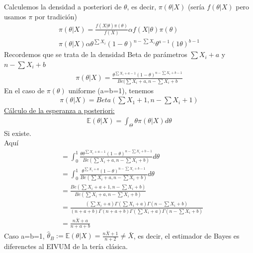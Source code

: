 \documentclass[10pt]{article}
\theoremstyle{plain}
\theoremstyle{definition}
\begin{document}
Calculemos la densidad a posteriori de $\theta$, es decir, $\pi(\theta|X)$ (sería $f(\theta|X)$ pero usamos $\pi$ por tradición)
\begin{align*}
\pi(\theta|X) = \frac{f(X|\theta)\pi(\theta)}{f(X)} \alpha f(X|\theta)\pi(\theta)\\
\pi(\theta|X) \alpha \theta^{\sum X_{i}}(1-\theta)^{n-\sum X_{i}} \theta^{a-1}(1\theta)^{b-1}
\end{align*}
Recordemos que se trata de la densidad Beta de parámetros $\sum X_{i}+a$ y $n-\sum X_{i} +b$
\begin{align*}
\pi(\theta|X) = \frac{\theta^{\sum X_{i}+a-1}(1-\theta)^{n-\sum X_{i} +b -1}}{Be(\sum X_{i}+a,n-\sum X_{i}+b}
\end{align*}
En el caso de $\pi(\theta)$ uniforme (a=b=1), tenemos
\begin{align*}
\pi(\theta|X) = Beta(\sum X_{1} + 1, n-\sum X_{i}+1)
\end{align*}
\underline{Cálculo de la esperanza a posteriori:}
\begin{align*}
\mathbb{E}(\theta|X) = \int_{\Theta}\theta\pi(\theta|X)d\theta
\end{align*}
Si existe.\\
Aquí
\begin{align*}
&= \int_{0}^{1} \frac{\theta\theta^{\sum X_{i}+a-1}(1-\theta)^{n-\sum X_{i} +b - 1}}{Be(\sum X_{i}+a,n-\sum X_{i}+b)}d\theta\\
&= \int_{0}^{1}\frac{\theta^{\sum X_{i} +a}(1-\theta)^{n-\sum X_{i} + b -1}}{Be(\sum X_{i}+a,n-\sum X_{i}+b)}d\theta\\
&= \frac{Be(\sum X_{i} +a +1,n-\sum X_{i} +b)}{Be(\sum X_{i}+a, n-\sum X_{i} +b)}\\
&= \frac{(\sum X_{i}+a)\Gamma(\sum X_{i} + a)\Gamma(n-\sum X_{i} +b)}{(n+a+b)\Gamma(n+a+b)\Gamma(\sum X_{i}+a)\Gamma(n-\sum X_{i} + b)}\\
&= \frac{n\bar{X}+a}{n+a+b}
\end{align*}
Caso a=b=1, $\hat{\theta}_{B} := \mathbb{E}(\theta|X) = \frac{n\bar{X}+1}{n+2} \not = \bar{X}$, es decir, el estimador de Bayes es diferenctes al EIVUM de la tería clásica.\\
\end{document}
